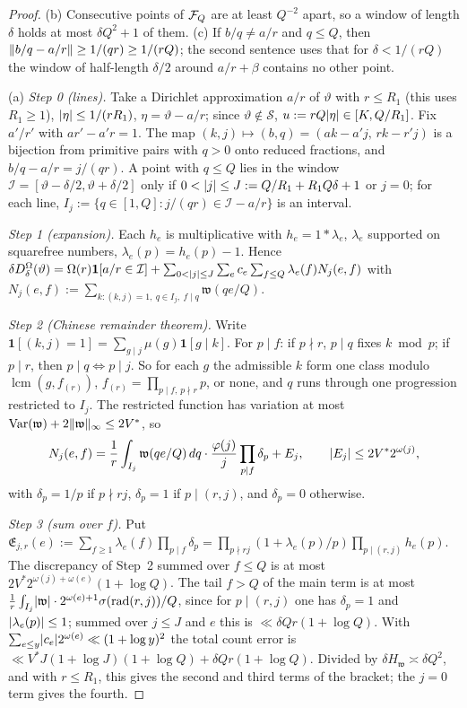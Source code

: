 \begin{proof}
(b) Consecutive points of $\mathcal F_Q$ are at least $Q^{-2}$ apart, so a window of length $\delta$ holds at most $\delta Q^2+1$ of them.
(c) If $b/q\ne a/r$ and $q\le Q$, then $\lVert b/q-a/r\rVert\ge1/(qr)\ge1/(rQ)$; the second sentence uses that for $\delta<1/(rQ)$ the window of
half-length $\delta/2$ around $a/r+\beta$ contains no other point.

(a) \emph{Step 0 (lines).} Take a Dirichlet approximation $a/r$ of $\vartheta$ with $r\le R_1$ (this uses $R_1\ge1$), $\lvert \eta\rvert\le1/(rR_1)$,
$\eta=\vartheta-a/r$; since $\vartheta\notin\mathcal S$, $u:=rQ\lvert \eta\rvert\in[K,Q/R_1]$. Fix $a'/r'$ with $ar'-a'r=1$. The map
$(k,j)\mapsto(b,q)=(ak-a'j,\,rk-r'j)$ is a bijection from primitive pairs with $q>0$ onto reduced fractions, and $b/q-a/r=j/(qr)$. A point
with $q\le Q$ lies in the window $\mathcal I=[\vartheta-\delta/2,\vartheta+\delta/2]$ only if $0<\lvert j\rvert\le J:=Q/R_1+R_1Q\delta+1$ or $j=0$; for each
line, $I_j:=\{q\in[1,Q]:j/(qr)\in\mathcal I-a/r\}$ is an interval.

\emph{Step 1 (expansion).} Each $h_e$ is multiplicative with $h_e=1*\lambda_e$, $\lambda_e$ supported on squarefree numbers,
$\lambda_e(p)=h_e(p)-1$. Hence
$\delta D^{\Omega}_\delta(\vartheta)=\Omega(r)\mathbf 1[a/r\in\mathcal I]+\sum_{0<\lvert j\rvert\le J}\sum_ec_e\sum_{f\le Q}\lambda_e(f)N_j(e,f)$ with
$N_j(e,f):=\sum_{k:(k,j)=1,\ q\in I_j,\ f\mid q}\mathfrak w(qe/Q)$.

\emph{Step 2 (Chinese remainder theorem).} Write $\mathbf 1[(k,j)=1]=\sum_{g\mid j}\mu(g)\mathbf 1[g\mid k]$. For $p\mid f$: if $p\nmid r$, $p\mid q$ fixes
$k\bmod p$; if $p\mid r$, then $p\mid q\iff p\mid j$. So for each $g$ the admissible $k$ form one class modulo $\operatorname{lcm}(g,f_{(r)})$,
$f_{(r)}=\prod_{p\mid f,\,p\nmid r}p$, or none, and $q$ runs through one progression restricted to $I_j$. The restricted function has variation
at most $\operatorname{Var}(\mathfrak w)+2\lVert \mathfrak w\rVert_\infty\le2V^*$, so
\[
N_j(e,f)=\frac1r\int_{I_j}\mathfrak w(qe/Q)\,dq\cdot\frac{\varphi(j)}j\prod_{p\mid f}\delta_p+E_j,\qquad\lvert E_j\rvert\le2V^*2^{\omega(j)},
\]
with $\delta_p=1/p$ if $p\nmid rj$, $\delta_p=1$ if $p\mid(r,j)$, and $\delta_p=0$ otherwise.

\emph{Step 3 (sum over $f$).} Put $\mathfrak E_{j,r}(e):=\sum_{f\ge1}\lambda_e(f)\prod_{p\mid f}\delta_p=\prod_{p\nmid rj}(1+\lambda_e(p)/p)\prod_{p\mid(r,j)}h_e(p)$. The
discrepancy of Step~2 summed over $f\le Q$ is at most $2V^*2^{\omega(j)+\omega(e)}(1+\log Q)$. The tail $f>Q$ of the main term is at most
$\frac1r\int_{I_j}\lvert \mathfrak w\rvert\cdot2^{\omega(e)+1}\sigma(\operatorname{rad}(r,j))/Q$, since for $p\mid(r,j)$ one has $\delta_p=1$ and $\lvert \lambda_e(p)\rvert\le1$; summed over
$j\le J$ and $e$ this is $\ll\delta Qr(1+\log Q)$. With $\sum_{e\le y}\lvert c_e\rvert2^{\omega(e)}\ll(1+\log y)^2$ the total count error is
$\ll V^*J(1+\log J)(1+\log Q)+\delta Qr(1+\log Q)$. Divided by $\delta H_{\mathfrak w}\asymp\delta Q^2$, and with $r\le R_1$, this gives the second and third
terms of the bracket; the $j=0$ term gives the fourth.


\end{proof}
